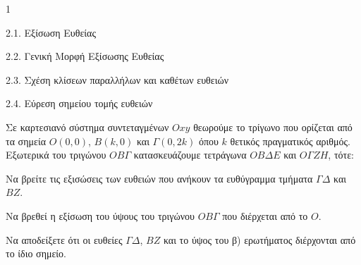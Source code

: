 \begin{ylh}{1}
    \item 2.1. Εξίσωση Ευθείας
    \item 2.2. Γενική Μορφή Εξίσωσης Ευθείας
    \item 2.3. Σχέση κλίσεων παραλλήλων και καθέτων ευθειών
    \item 2.4. Εύρεση σημείου τομής ευθειών
\end{ylh}
Σε καρτεσιανό σύστημα συντεταγμένων $Oxy$ θεωρούμε το τρίγωνο που ορίζεται από τα σημεία $O(0, 0)$, $B(k, 0)$ και $\Gamma(0,2k)$ όπου $k$ θετικός πραγματικός αριθμός. Εξωτερικά του τριγώνου $OB\Gamma$ κατασκευάζουμε τετράγωνα $OB\Delta E$ και $O\Gamma ZH$, τότε:
\begin{alist}
\item Να βρείτε τις εξισώσεις των ευθειών που ανήκουν τα ευθύγραμμα τμήματα $\Gamma\Delta$ και $BZ$.  
\item Να βρεθεί η εξίσωση του ύψους του τριγώνου $OB\Gamma$ που διέρχεται από το $O$.  
\item Να αποδείξετε ότι οι ευθείες $\Gamma\Delta$, $BZ$ και το ύψος του β) ερωτήματος διέρχονται από το ίδιο σημείο.  
\end{alist}